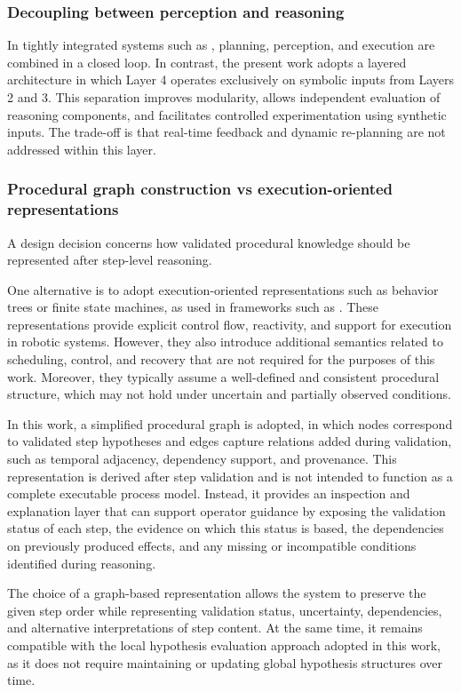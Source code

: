 \subsubsection{Decoupling between perception and reasoning}
In tightly integrated systems such as \citep{Zhao2025VideoToBT}, planning, perception, and execution are combined in a closed loop. In contrast, the present work adopts a layered architecture in which Layer 4 operates exclusively on symbolic inputs from Layers 2 and 3. This separation improves modularity, allows independent evaluation of reasoning components, and facilitates controlled experimentation using synthetic inputs. The trade-off is that real-time feedback and dynamic re-planning are not addressed within this layer.

\subsubsection{Procedural graph construction vs execution-oriented representations}

A design decision concerns how validated procedural knowledge should be represented after step-level reasoning.

One alternative is to adopt execution-oriented representations such as behavior trees or finite state machines, as used in frameworks such as \citep{Zhao2025VideoToBT}. These representations provide explicit control flow, reactivity, and support for execution in robotic systems. However, they also introduce additional semantics related to scheduling, control, and recovery that are not required for the purposes of this work. Moreover, they typically assume a well-defined and consistent procedural structure, which may not hold under uncertain and partially observed conditions.

In this work, a simplified procedural graph is adopted, in which nodes correspond to validated step hypotheses and edges capture relations added during validation, such as temporal adjacency, dependency support, and provenance. This representation is derived after step validation and is not intended to function as a complete executable process model. Instead, it provides an inspection and explanation layer that can support operator guidance by exposing the validation status of each step, the evidence on which this status is based, the dependencies on previously produced effects, and any missing or incompatible conditions identified during reasoning.

The choice of a graph-based representation allows the system to preserve the given step order while representing validation status, uncertainty, dependencies, and alternative interpretations of step content. At the same time, it remains compatible with the local hypothesis evaluation approach adopted in this work, as it does not require maintaining or updating global hypothesis structures over time.

